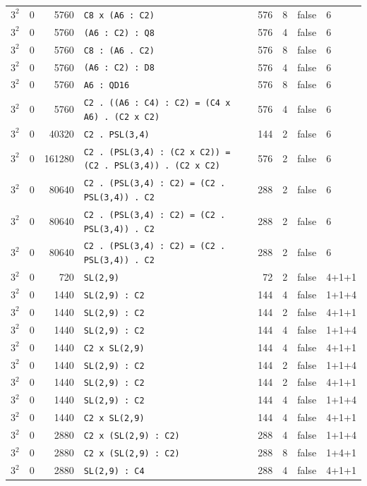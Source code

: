 \begin{longtable}{llrlrrll}
$3^2$ & 0 & 5760 & \texttt{C8 x (A6 : C2)} & 576 & 8 & false & 6\\
$3^2$ & 0 & 5760 & \texttt{(A6 : C2) : Q8} & 576 & 4 & false & 6\\
$3^2$ & 0 & 5760 & \texttt{C8 : (A6 . C2)} & 576 & 8 & false & 6\\
$3^2$ & 0 & 5760 & \texttt{(A6 : C2) : D8} & 576 & 4 & false & 6\\
$3^2$ & 0 & 5760 & \texttt{A6 : QD16} & 576 & 8 & false & 6\\
$3^2$ & 0 & 5760 & \texttt{C2 . ((A6 : C4) : C2) = (C4 x A6) . (C2 x C2)} & 576 & 4 & false & 6\\
$3^2$ & 0 & 40320 & \texttt{C2 . PSL(3,4)} & 144 & 2 & false & 6\\
$3^2$ & 0 & 161280 & \texttt{C2 . (PSL(3,4) : (C2 x C2)) = (C2 . PSL(3,4)) . (C2 x C2)} & 576 & 2 & false & 6\\
$3^2$ & 0 & 80640 & \texttt{C2 . (PSL(3,4) : C2) = (C2 . PSL(3,4)) . C2} & 288 & 2 & false & 6\\
$3^2$ & 0 & 80640 & \texttt{C2 . (PSL(3,4) : C2) = (C2 . PSL(3,4)) . C2} & 288 & 2 & false & 6\\
$3^2$ & 0 & 80640 & \texttt{C2 . (PSL(3,4) : C2) = (C2 . PSL(3,4)) . C2} & 288 & 2 & false & 6\\
$3^2$ & 0 & 720 & \texttt{SL(2,9)} & 72 & 2 & false & 4+1+1\\
$3^2$ & 0 & 1440 & \texttt{SL(2,9) : C2} & 144 & 4 & false & 1+1+4\\
$3^2$ & 0 & 1440 & \texttt{SL(2,9) : C2} & 144 & 2 & false & 4+1+1\\
$3^2$ & 0 & 1440 & \texttt{SL(2,9) : C2} & 144 & 4 & false & 1+1+4\\
$3^2$ & 0 & 1440 & \texttt{C2 x SL(2,9)} & 144 & 4 & false & 4+1+1\\
$3^2$ & 0 & 1440 & \texttt{SL(2,9) : C2} & 144 & 2 & false & 1+1+4\\
$3^2$ & 0 & 1440 & \texttt{SL(2,9) : C2} & 144 & 2 & false & 4+1+1\\
$3^2$ & 0 & 1440 & \texttt{SL(2,9) : C2} & 144 & 4 & false & 1+1+4\\
$3^2$ & 0 & 1440 & \texttt{C2 x SL(2,9)} & 144 & 4 & false & 4+1+1\\
$3^2$ & 0 & 2880 & \texttt{C2 x (SL(2,9) : C2)} & 288 & 4 & false & 1+1+4\\
$3^2$ & 0 & 2880 & \texttt{C2 x (SL(2,9) : C2)} & 288 & 8 & false & 1+4+1\\
$3^2$ & 0 & 2880 & \texttt{SL(2,9) : C4} & 288 & 4 & false & 4+1+1\\

\end{longtable}
